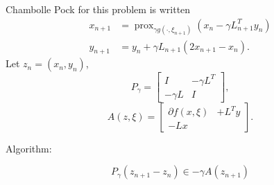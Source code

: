 \documentclass{article}
\DeclareMathOperator{\prox}{prox}
\newcommand{\1}{\mathbbm 1}
\theoremstyle{definition}
\begin{document}
Chambolle Pock for this problem is written
\begin{align}
    x_{n+1} &= \prox_{\gamma g(\cdot,\xi_{n+1})}(x_n - \gamma L_{n+1}^T y_n)\\
    y_{n+1} &= y_n + \gamma L_{n+1}(2 x_{n+1} - x_n).
\end{align}
Let $z_n = (x_n, y_n)$, 
\[
P_\gamma = \begin{bmatrix} I &  -\gamma L^T \\ -\gamma L & I \end{bmatrix},
\]
\[
A(z,\xi) = \begin{bmatrix} \partial f(x,\xi)&  + L^T y \\ -L x& \end{bmatrix} .
\]

Algorithm:

$$
P_\gamma(z_{n+1} - z_n) \in -\gamma A(z_{n+1}) 
$$
\end{document}
